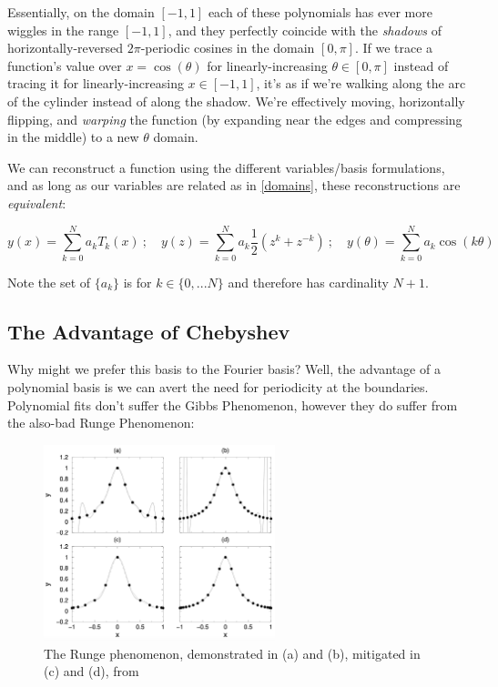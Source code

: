\documentclass[10pt]{article}
\begin{document}
Essentially, on the domain $[-1, 1]$ each of these polynomials has ever more wiggles in the range $[-1, 1]$, and they perfectly coincide with the \textit{shadows} of horizontally-reversed $2\pi$-periodic cosines in the domain $[0, \pi]$. If we trace a function's value over $x = \cos(\theta)$ for linearly-increasing $\theta \in [0, \pi]$ instead of tracing it for linearly-increasing $x \in [-1, 1]$, it's as if we're walking along the arc of the cylinder instead of along the shadow. We're effectively moving, horizontally flipping, and \textit{warping} the function (by expanding near the edges and compressing in the middle) to a new $\theta$ domain.

We can reconstruct a function using the different variables/basis formulations, and as long as our variables are related as in \autoref{domains}, these reconstructions are \textit{equivalent}:

\begin{equation}\label{equivalent}
y(x) = \sum_{k=0}^N a_k T_k(x)\ ;\quad y(z) = \sum_{k=0}^N a_k \frac{1}{2}(z^k + z^{-k})\ ;\quad y(\theta) = \sum_{k=0}^N a_k \cos(k \theta)
\end{equation}

Note the set of $\{a_k\}$ is for $k \in \{0, ... N\}$ and therefore has cardinality $N+1$.

\subsection{The Advantage of Chebyshev}

Why might we prefer this basis to the Fourier basis? Well, the advantage of a polynomial basis is we can avert the need for periodicity at the boundaries. Polynomial fits don't suffer the Gibbs Phenomenon, however they do suffer from the also-bad Runge Phenomenon\cite{kutz}:

\begin{figure}[h!]
	\centering
	\includegraphics[width=0.6\textwidth]{runge.png}
	\captionsetup{width=0.6\textwidth}
	\caption*{The Runge phenomenon, demonstrated in (a) and (b), mitigated in (c) and (d), from \cite{kutz}}
\end{figure}
\end{document}

